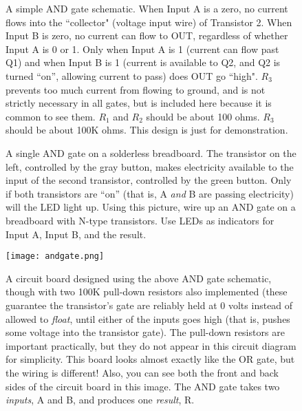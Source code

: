 \bigskip

\begin{figure}[!ht]
\begin{center}


\caption{A simple AND gate schematic. When Input A is a zero, no current flows into the ``collector" (voltage input wire) of Transistor 2. When Input B is zero, no current can flow to OUT, regardless of whether Input A is 0 or 1. Only when Input A is 1 (current can flow past Q1) and when Input B is 1 (current is available to Q2, and Q2 is turned ``on'', allowing current to pass) does OUT go ``high". $R_3$ prevents too much current from flowing to ground, and is not strictly necessary in all gates, but is included here because it is common to see them. $R_1$ and $R_2$ should be about 100 ohms. $R_3$ should be about 100K ohms. This design is just for demonstration.}
\label{fig:simpleandgate}
\end{center}
\end{figure}


\begin{figure}[!ht]
\begin{center}
\medskip

A single AND gate on a solderless breadboard. The transistor on the left, controlled by the gray button, makes electricity available to the input of the second transistor, controlled by the green button. Only if both transistors are ``on'' (that is, A \emph{and} B are passing electricity) will the LED light up. Using this picture, wire up an AND gate on a breadboard with N-type transistors. Use LEDs as indicators for Input A, Input B, and the result.
\end{center}
\end{figure}





\begin{figure}[!ht]
\begin{center}
\texttt{[image: andgate.png]}
\caption{A circuit board designed using the above AND gate schematic, though with two 100K pull-down resistors also implemented (these guarantee the transistor's gate are reliably held at 0 volts instead of allowed to \emph{float}, until either of the inputs goes high (that is, pushes some voltage into the transistor gate). The pull-down resistors are important practically, but they do not appear in this circuit diagram for simplicity. This board looks almost exactly like the OR gate, but the wiring is different! Also, you can see both the front and back sides of the circuit board in this image. The AND gate takes two \emph{inputs}, A and B, and produces one \emph{result}, R.}
\end{center}
\label{fig:andgate}
\end{figure}


